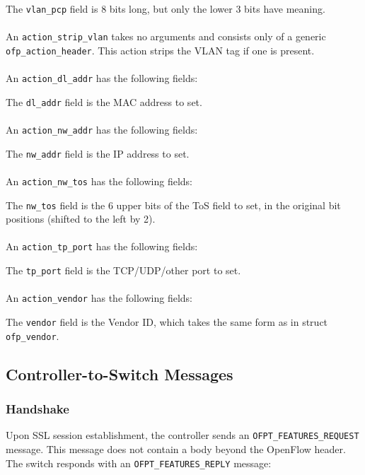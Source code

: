 
The \verb|vlan_pcp| field is 8 bits long, but only the lower 3 bits have meaning.  
\\\\
An \verb|action_strip_vlan| takes no arguments and consists only of a generic \verb|ofp_action_header|.  This action strips the VLAN tag if one is present.
\\\\
An \verb|action_dl_addr| has the following fields:


The \verb|dl_addr| field is the MAC address to set.
\\\\
An \verb|action_nw_addr| has the following fields:


The \verb|nw_addr| field is the IP address to set.
\\\\
An \verb|action_nw_tos| has the following fields:


The \verb|nw_tos| field is the 6 upper bits of the ToS field to set, in the original bit positions (shifted to the left by 2).
\\\\
An \verb|action_tp_port| has the following fields:


The \verb|tp_port| field is the TCP/UDP/other port to set.
\\\\
An \verb|action_vendor| has the following fields:


The \verb|vendor| field is the Vendor ID, which takes the same form as in struct \verb|ofp_vendor|.

\subsection{Controller-to-Switch Messages}

\subsubsection{Handshake}
\label{cts:handshake} 
Upon SSL session establishment, the controller sends an \verb|OFPT_FEATURES_REQUEST| message.  This message does not contain a body beyond the OpenFlow header.  The switch responds with an \verb|OFPT_FEATURES_REPLY| message:

